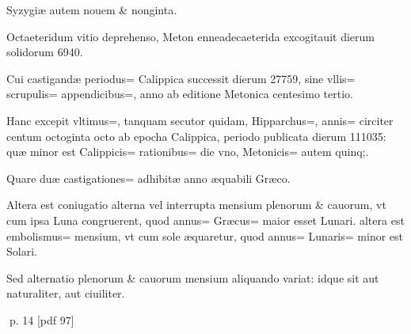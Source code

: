 \begin{parnumbers}
Syzygiæ autem nouem \& nonginta.

Octaeteridum vitio deprehenso, Meton enneadecaeterida excogitauit dierum solidorum 6940.

Cui castigandæ periodus= Calippica successit dierum 27759, sine vllis= scrupulis= appendicibus=, anno ab editione Metonica centesimo tertio.

Hanc excepit vltimus=, tanquam secutor quidam,  Hipparchus=, annis= circiter centum octoginta octo ab epocha Calippica, periodo publicata dierum 111035: quæ minor est Calippicis= rationibus= die vno, Metonicis= autem quinq;.

Quare duæ castigationes= adhibitæ anno æquabili Græco.

Altera est coniugatio alterna vel interrupta mensium plenorum \& cauorum, vt cum ipsa Luna congruerent, quod annus= Græcus= maior esset Lunari. altera est embolismus= mensium, vt cum sole æquaretur, quod annus= Lunaris= minor est Solari.

Sed alternatio plenorum \& cauorum mensium aliquando variat: idque sit aut naturaliter, aut ciuiliter.

\end{parnumbers}
\clearpage
p. 14 [pdf 97]

